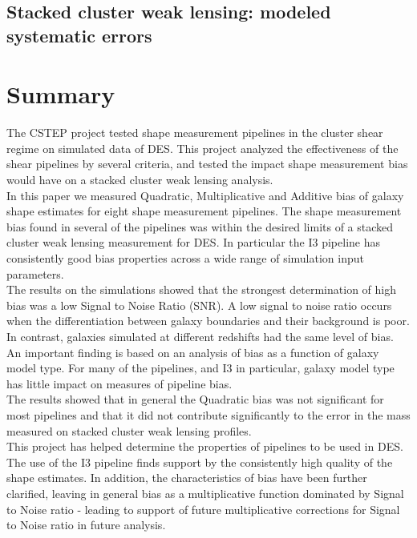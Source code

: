 \documentclass[useAMS,usenatbib]{mn2e}
\begin{document}
\subsection{Stacked cluster weak lensing: modeled systematic errors}\label{sec:p2}


\section{Summary}
The CSTEP project tested shape measurement pipelines in the cluster
shear regime on simulated data of DES. This project
analyzed the effectiveness of the shear pipelines by several criteria,
and tested the impact shape measurement bias would have on a stacked
cluster weak lensing analysis. \\

In this paper we measured Quadratic, Multiplicative and
Additive bias of galaxy shape estimates for eight shape measurement
pipelines. The shape measurement bias found in several of the pipelines was within the
desired limits of a stacked cluster weak lensing measurement for
DES. In particular the I3 pipeline has consistently good bias properties
across a wide range of simulation input parameters.\\

The results on the simulations showed that the strongest
determination of high bias was a low Signal to Noise Ratio (SNR). A
low signal to noise ratio occurs when the differentiation between
galaxy boundaries and their background is poor. In contrast, galaxies 
simulated at different redshifts had the same level of bias. An
important finding is based on an analysis of bias as a function of galaxy model
type. For many of the pipelines, and I3 in particular, galaxy
model type has little impact on measures of pipeline bias. \\

The results showed that in general the Quadratic bias was not
significant for most pipelines and that it did not contribute
significantly to the error in the mass measured on stacked cluster
weak lensing profiles. \\

This project has helped determine the properties of pipelines
to be used in DES. The use of the I3 pipeline
finds support by the consistently high quality of the shape
estimates. In addition, the characteristics of bias have been further
clarified, leaving in general bias as a multiplicative function
dominated by Signal to Noise ratio - leading to support of future
multiplicative corrections for Signal to Noise ratio in future
analysis. \\
\end{document}
